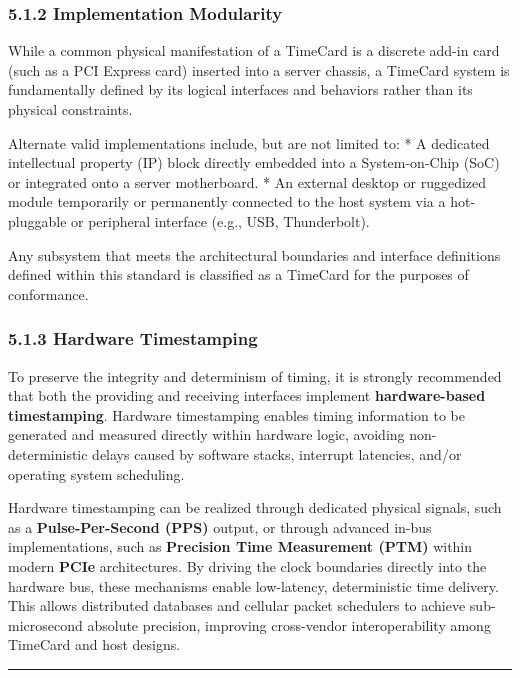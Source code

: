 \documentclass[
]{article}
\begin{document}
\subsubsection{5.1.2 Implementation
Modularity}\label{implementation-modularity}

While a common physical manifestation of a TimeCard is a discrete add-in
card (such as a PCI Express card) inserted into a server chassis, a
TimeCard system is fundamentally defined by its logical interfaces and
behaviors rather than its physical constraints.

Alternate valid implementations include, but are not limited to: * A
dedicated intellectual property (IP) block directly embedded into a
System-on-Chip (SoC) or integrated onto a server motherboard. * An
external desktop or ruggedized module temporarily or permanently
connected to the host system via a hot-pluggable or peripheral interface
(e.g., USB, Thunderbolt).

Any subsystem that meets the architectural boundaries and interface
definitions defined within this standard is classified as a TimeCard for
the purposes of conformance.

\subsubsection{5.1.3 Hardware Timestamping}\label{hardware-timestamping}

To preserve the integrity and determinism of timing, it is strongly
recommended that both the providing and receiving interfaces implement
\textbf{hardware-based timestamping}. Hardware timestamping enables
timing information to be generated and measured directly within hardware
logic, avoiding non-deterministic delays caused by software stacks,
interrupt latencies, and/or operating system scheduling.

Hardware timestamping can be realized through dedicated physical
signals, such as a \textbf{Pulse-Per-Second (PPS)} output, or through
advanced in-bus implementations, such as \textbf{Precision Time
Measurement (PTM)} within modern \textbf{PCIe} architectures. By driving
the clock boundaries directly into the hardware bus, these mechanisms
enable low-latency, deterministic time delivery. This allows distributed
databases and cellular packet schedulers to achieve sub-microsecond
absolute precision, improving cross-vendor interoperability among
TimeCard and host designs.

\begin{center}\rule{0.5\linewidth}{0.5pt}\end{center}
\end{document}
